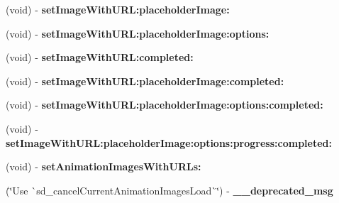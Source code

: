\begin{DoxyCompactItemize}
(void) -\/ {\bfseries set\+Image\+With\+U\+R\+L\+:placeholder\+Image\+:}
\item 
\mbox{\label{category_u_i_image_view_07_web_cache_deprecated_08_a64439251752a3e6d05ea0048f890de20}} 
(void) -\/ {\bfseries set\+Image\+With\+U\+R\+L\+:placeholder\+Image\+:options\+:}
\item 
\mbox{\label{category_u_i_image_view_07_web_cache_deprecated_08_ae63378d5e281f75357307ae22b214288}} 
(void) -\/ {\bfseries set\+Image\+With\+U\+R\+L\+:completed\+:}
\item 
\mbox{\label{category_u_i_image_view_07_web_cache_deprecated_08_abe4ed894259f4e7c6e67075befcd23c8}} 
(void) -\/ {\bfseries set\+Image\+With\+U\+R\+L\+:placeholder\+Image\+:completed\+:}
\item 
\mbox{\label{category_u_i_image_view_07_web_cache_deprecated_08_ab6d74e590766c217b23f326339591e1d}} 
(void) -\/ {\bfseries set\+Image\+With\+U\+R\+L\+:placeholder\+Image\+:options\+:completed\+:}
\item 
\mbox{\label{category_u_i_image_view_07_web_cache_deprecated_08_a828f2953a000953933379e6400acad98}} 
(void) -\/ {\bfseries set\+Image\+With\+U\+R\+L\+:placeholder\+Image\+:options\+:progress\+:completed\+:}
\item 
\mbox{\label{category_u_i_image_view_07_web_cache_deprecated_08_ad1d56b45c88fda02294d2df8c820c175}} 
(void) -\/ {\bfseries set\+Animation\+Images\+With\+U\+R\+Ls\+:}
\item 
\mbox{\label{category_u_i_image_view_07_web_cache_deprecated_08_ac76fd2691079d4ecf8e24913a99ceb60}} 
(\char`\"{}Use \`{}sd\+\_\+cancel\+Current\+Animation\+Images\+Load\`{}\char`\"{}) -\/ {\bfseries \+\_\+\+\_\+deprecated\+\_\+msg}
\item 
\mbox{\label{category_u_i_image_view_07_web_cache_deprecated_08_a0184d8f358c9009de3cf96d844df495b}} 

\end{DoxyCompactItemize}
